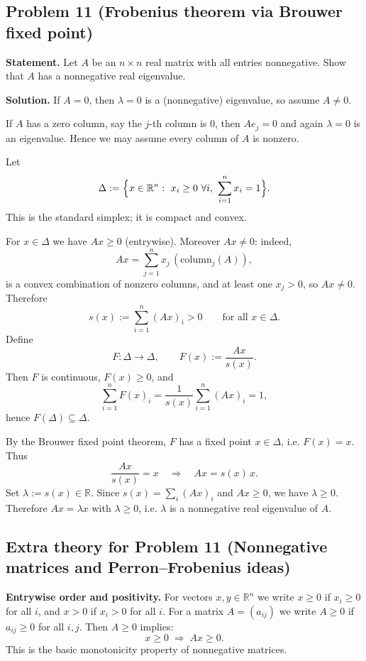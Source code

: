 \documentclass[12pt,a4paper]{article}
\theoremstyle{plain}
\theoremstyle{definition}      %
\begin{document}
\subsection*{Problem 11 (Frobenius theorem via Brouwer fixed point)}

\textbf{Statement.} Let $A$ be an $n\times n$ real matrix with all entries nonnegative.
Show that $A$ has a nonnegative real eigenvalue.

\medskip
\noindent\textbf{Solution.}
If $A=0$, then $\lambda=0$ is a (nonnegative) eigenvalue, so assume $A\neq 0$.

If $A$ has a zero column, say the $j$-th column is $0$, then $Ae_j=0$ and again $\lambda=0$ is an eigenvalue.
Hence we may assume every column of $A$ is nonzero.

Let
\[
\Delta:=\Bigl\{x\in\mathbb{R}^n:\ x_i\ge 0\ \forall i,\ \sum_{i=1}^n x_i=1\Bigr\}.
\]
This is the standard simplex; it is compact and convex.

For $x\in\Delta$ we have $Ax\ge 0$ (entrywise). Moreover $Ax\neq 0$:
indeed,
\[
Ax=\sum_{j=1}^n x_j\,(\text{column}_j(A)),
\]
is a convex combination of nonzero columns, and at least one $x_j>0$, so $Ax\neq 0$.
Therefore
\[
s(x):=\sum_{i=1}^n (Ax)_i >0 \qquad \text{for all } x\in\Delta.
\]
Define
\[
F:\Delta\to \Delta,\qquad F(x):=\frac{Ax}{s(x)}.
\]
Then $F$ is continuous, $F(x)\ge 0$, and
\[
\sum_{i=1}^n F(x)_i = \frac{1}{s(x)}\sum_{i=1}^n (Ax)_i = 1,
\]
hence $F(\Delta)\subseteq \Delta$.

By the Brouwer fixed point theorem, $F$ has a fixed point $x\in\Delta$, i.e. $F(x)=x$.
Thus
\[
\frac{Ax}{s(x)}=x \quad\Longrightarrow\quad Ax=s(x)\,x.
\]
Set $\lambda:=s(x)\in\mathbb{R}$. Since $s(x)=\sum_i (Ax)_i$ and $Ax\ge 0$, we have $\lambda\ge 0$.
Therefore $Ax=\lambda x$ with $\lambda\ge 0$, i.e. $\lambda$ is a nonnegative real eigenvalue of $A$.

\subsection*{Extra theory for Problem 11 (Nonnegative matrices and Perron--Frobenius ideas)}

\noindent\textbf{Entrywise order and positivity.}
For vectors $x,y\in\mathbb{R}^n$ we write $x\ge 0$ if $x_i\ge 0$ for all $i$, and $x>0$ if $x_i>0$ for all $i$.
For a matrix $A=(a_{ij})$ we write $A\ge 0$ if $a_{ij}\ge 0$ for all $i,j$.
Then $A\ge 0$ implies:
\[
x\ge 0 \;\Longrightarrow\; Ax\ge 0.
\]
This is the basic monotonicity property of nonnegative matrices.
\end{document}
